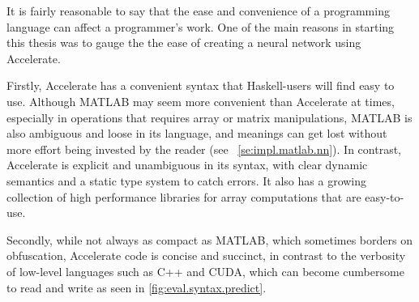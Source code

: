 It is fairly reasonable to say that the ease and convenience of a programming language can affect a programmer's work. One of the main reasons in starting this thesis was to gauge the the ease of creating a neural network using Accelerate.

Firstly, Accelerate has a convenient syntax that Haskell-users will find easy to use. Although MATLAB may seem more convenient than Accelerate at times, especially in operations that requires array or matrix manipulations, MATLAB is also ambiguous and loose in its language, and meanings can get lost without more effort being invested by the reader (see ~\ref{se:impl.matlab.nn}). In contrast, Accelerate is explicit and unambiguous in its syntax, with clear dynamic semantics and a static type system to catch errors. It also has a growing collection of high performance libraries for array computations that are easy-to-use.

Secondly, while not always as compact as MATLAB, which sometimes borders on obfuscation, Accelerate code is concise and succinct, in contrast to the verbosity of low-level languages such as C++ and CUDA, which can become cumbersome to read and write as seen in \ref{fig:eval.syntax.predict}.

